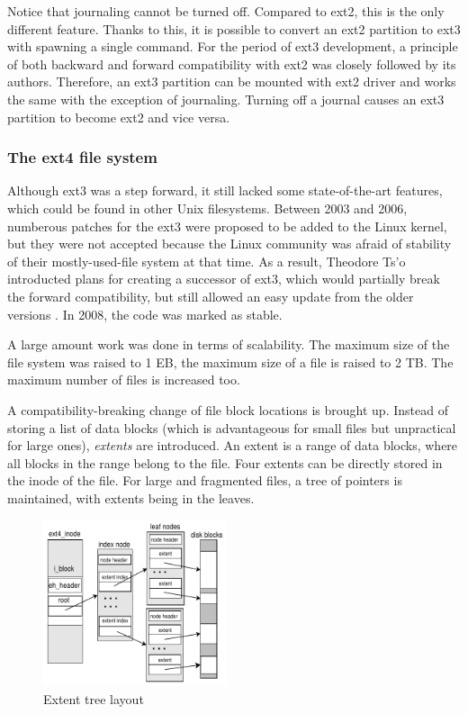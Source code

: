 \documentclass{acm_proc_article-sp}
\begin{document}
Notice that journaling cannot be turned off. Compared to ext2, this is the only different feature. Thanks to this, it is possible to convert an ext2 partition to ext3 with spawning a single command.
For the period of ext3 development, a principle of both backward and forward compatibility with ext2 was closely followed by its authors. Therefore, an ext3 partition can be mounted with ext2 driver and works the same with the exception of journaling. Turning off a journal causes an ext3 partition to become ext2 and vice versa.

\subsubsection{The ext4 file system}

Although ext3 was a step forward, it still lacked some state-of-the-art features, which could be found in other Unix filesystems. Between 2003 and 2006, numberous patches for the ext3 were proposed to be added to the Linux kernel, but they were not accepted because the Linux community was afraid of stability of their mostly-used-file system at that time. As a result, Theodore Ts'o introducted plans for creating a successor of ext3, which would partially break the forward compatibility, but still allowed an easy update from the older versions \cite{newext4}. In 2008, the code was marked as stable.

A large amount work was done in terms of scalability. The maximum size of the file system was raised to 1 EB, the maximum size of a file is raised to 2 TB. The maximum number of files is increased too.

A compatibility-breaking change of file block locations is brought up. Instead of storing a list of data blocks (which is advantageous for small files but unpractical for large ones), {\it extents} are introduced. An extent is a range of data blocks, where all blocks in the range belong to the file. Four extents can be directly stored in the inode of the file. For large and fragmented files, a tree of pointers is maintained, with extents being in the leaves.

\begin{figure}
\centering
\includegraphics[width=0.48\textwidth]{images/extents.pdf}
	\caption{Extent tree layout \cite{newext4}}
\end{figure}
\end{document}
